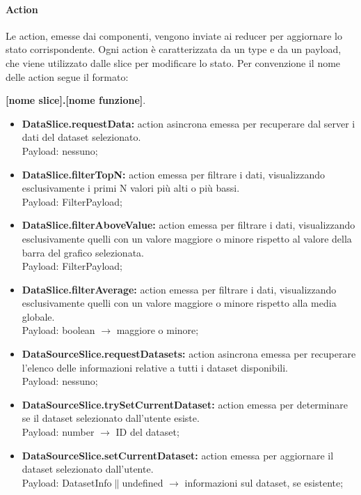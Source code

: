 \paragraph{Action}
Le action, emesse dai componenti, vengono inviate ai reducer per aggiornare lo
stato corrispondente. Ogni action è caratterizzata da un type e da un payload,
che viene utilizzato dalle slice per modificare lo stato. Per convenzione il
nome delle action segue il formato: \\
\begin{center}
    \textbf{[nome slice].[nome funzione]}.
\end{center}
\begin{itemize}
    \item \textbf{DataSlice.requestData:} action asincrona emessa per recuperare dal server i dati del dataset selezionato. \\ Payload: nessuno;
    \item \textbf{DataSlice.filterTopN:} action emessa per filtrare i dati, visualizzando esclusivamente i primi N valori più alti o più bassi. \\ Payload: FilterPayload;
    \item \textbf{DataSlice.filterAboveValue:} action emessa per filtrare i dati, visualizzando esclusivamente quelli con un valore maggiore o minore rispetto al valore della barra del grafico selezionata.\\ Payload: FilterPayload;
    \item \textbf{DataSlice.filterAverage:} action emessa per filtrare i dati, visualizzando esclusivamente quelli con un valore maggiore o minore rispetto alla media globale. \\ Payload: boolean $\rightarrow$ maggiore o minore;
    \item \textbf{DataSourceSlice.requestDatasets:} action asincrona emessa per recuperare l'elenco delle informazioni relative a tutti i dataset disponibili. \\ Payload: nessuno;
    \item \textbf{DataSourceSlice.trySetCurrentDataset:} action emessa per determinare se il dataset selezionato dall'utente esiste. \\ Payload: number $\rightarrow$ ID del dataset;
    \item \textbf{DataSourceSlice.setCurrentDataset:} action emessa per aggiornare il dataset selezionato dall'utente. \\ Payload: DatasetInfo$\|$undefined $\rightarrow$ informazioni sul dataset, se esistente;

\end{itemize}
